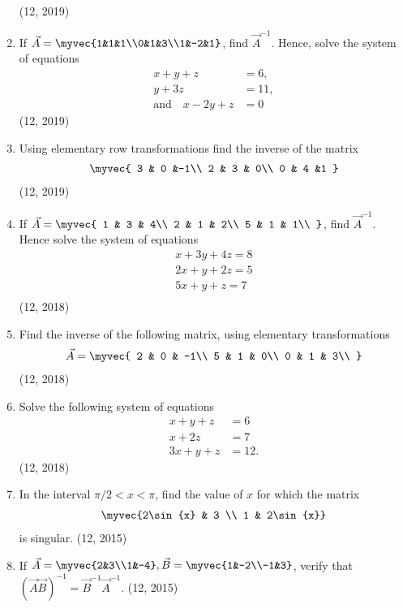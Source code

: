 \begin{enumerate}[label=\thesubsection.\arabic*,ref=\thesubsection.\theenumi]
\begin{align*}
\end{align*}
\hfill (12, 2019)
\item If $\vec{A} = \myvec{1&1&1\\0&1&3\\1&-2&1}$, find $\vec{A}^{-1}$.
Hence, solve the system of equations 
\begin{align*}
    x+y+z&=6 ,\\
    y+3z&=11 ,\\
    \text  {and} \hspace{12pt}x-2y+z&= 0
\end{align*}
\hfill (12, 2019)
\item Using elementary row transformations find the inverse of the matrix
\begin{align*}
	\myvec{
			3 & 0 &-1\\
			2 & 3 & 0\\
			0 & 4 &1
		}
\end{align*}
\hfill (12, 2019)
\item If $\vec{A}=\myvec{
    1 & 3 & 4\\
    2 & 1 & 2\\
    5 & 1 & 1\\
}$,
find  ${\vec{A}}^{-1}$. Hence solve the system of equations 
\begin{align*}
      {x + 3y + 4z = 8} \\
      {2x + y + 2z = 5}\\
    {5x + y + z = 7}\\
\end{align*}
\hfill (12, 2018)
\item Find the inverse of the following matrix, using elementary transformations
\begin{align*}
\vec{A}= \myvec{
    2 & 0 & -1\\
    5 & 1 & 0\\
    0 & 1 & 3\\
}
\end{align*}
\hfill (12, 2018)
  \item 
	  Solve the following system of equations 
\begin{align*}
	x+y+z&= 6
	  \\
	  x+2z&=7
	  \\
	  3x+y+z&=12. 
\end{align*}
\hfill (12, 2018)
\item In the interval ${\pi}/2<x<\pi$, find the value of $x$ for which the matrix 
\begin{align*}
	\myvec{2\sin{x} & 3 \\ 1 & 2\sin{x}}
\end{align*}
 is singular.
\hfill (12, 2015)
\item If $\vec{A} = \myvec{2&3\\1&-4}, \vec{B} = \myvec{1&-2\\-1&3}$, verify that $(\vec{A}\vec{B})^{-1} = \vec{B}^{-1}\vec{A}^{-1}$. 
\hfill (12, 2015)


\end{enumerate}
